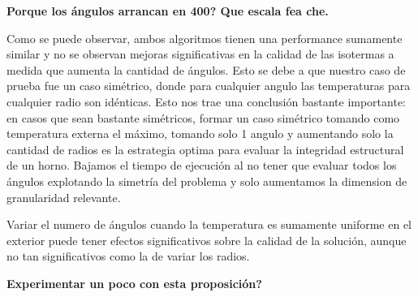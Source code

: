 \textbf{Porque los ángulos arrancan en 400? Que escala fea che.}

Como se puede observar, ambos algoritmos tienen una performance sumamente similar y no se observan mejoras significativas en la calidad de las isotermas a medida que aumenta la cantidad de ángulos. Esto se debe a que nuestro caso de prueba fue un caso simétrico, donde para cualquier angulo las temperaturas para cualquier radio son idénticas. Esto nos trae una conclusión bastante importante: en casos que sean bastante simétricos, formar un caso simétrico tomando como temperatura externa el máximo, tomando solo 1 angulo y aumentando solo la cantidad de radios es la estrategia optima para evaluar la integridad estructural de un horno. Bajamos el tiempo de ejecución al no tener que evaluar todos los ángulos explotando la simetría del problema y solo aumentamos la dimension de granularidad relevante.

Variar el numero de ángulos cuando la temperatura es sumamente uniforme en el exterior puede tener efectos significativos sobre la calidad de la solución, aunque no tan significativos como la de variar los radios.

\textbf{Experimentar un poco con esta proposición?}

